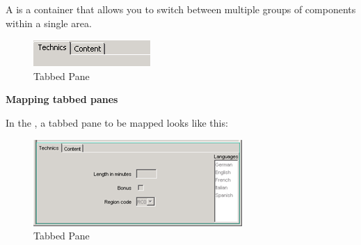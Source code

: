 A  is a container that allows you to switch between multiple groups of components within a single area.



\begin{figure}
\begin{center}
\includegraphics{PS/Tab}
\caption{Tabbed Pane}
\label{tabbedpane}
\end{center}
\end{figure}

\textbf{Mapping tabbed panes}

In the \gdomm{}, a tabbed pane to be mapped looks like this:

\begin{figure}
\begin{center}
\includegraphics{PS/Maptab}
\caption{Tabbed Pane}
\label{maptab}
\end{center}
\end{figure}
